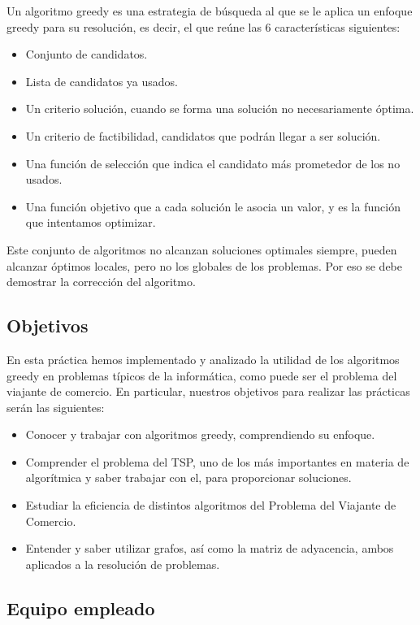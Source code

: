 Un algoritmo greedy es una estrategia de búsqueda al que se le aplica un enfoque 
greedy para su resolución, es decir, el que reúne las 6 características siguientes:

\begin{itemize}
    \item Conjunto de candidatos.
    \item Lista de candidatos ya usados.
    \item Un criterio solución, cuando se forma una solución no necesariamente óptima.
    \item Un criterio de factibilidad, candidatos que podrán llegar a ser solución.
    \item Una función de selección que indica el candidato más prometedor de los no usados.
    \item Una función objetivo que a cada solución le asocia un valor, y es la función que intentamos optimizar.
\end{itemize}

Este conjunto de algoritmos no alcanzan soluciones optimales siempre, pueden 
alcanzar óptimos locales, pero no los globales de los problemas.
Por eso se debe demostrar la corrección del algoritmo.

\subsection{Objetivos}

En esta práctica hemos implementado y analizado la utilidad de los algoritmos 
greedy en problemas típicos de la informática, como puede ser el problema
del viajante de comercio. En particular, nuestros objetivos para realizar
las prácticas serán las siguientes:

\begin{itemize}
    \item Conocer y trabajar con algoritmos greedy, comprendiendo su enfoque.
    \item Comprender el problema del TSP, uno de los más importantes en materia de algorítmica y saber trabajar con el, para proporcionar soluciones.
    \item Estudiar la eficiencia de distintos algoritmos del Problema del Viajante de Comercio.
    \item Entender y saber utilizar grafos, así como la matriz de adyacencia, ambos aplicados a la resolución de problemas.
\end{itemize}

\subsection{Equipo empleado}

